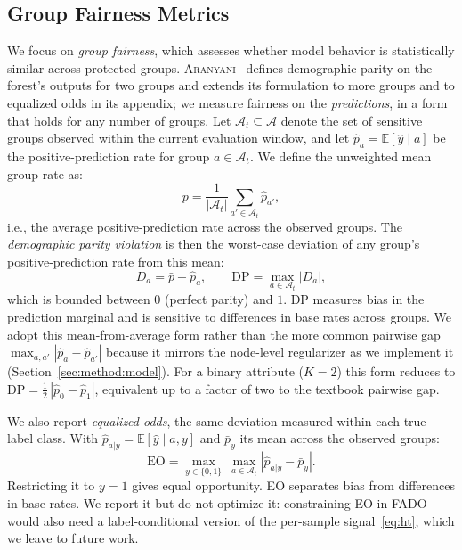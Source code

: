 \documentclass[conference]{IEEEtran}
\newcommand{\fado}{\textsc{FADO}}
\newcommand{\ara}{\textsc{Aranyani}}
\begin{document}
\subsection{Group Fairness Metrics}
\label{sec:problem:metrics}
We focus on \emph{group fairness}, which assesses whether model behavior is statistically similar across protected groups. \ara{}~\cite{chowdhury2024enhancing}
defines demographic parity on the forest's outputs for two groups and extends its formulation to more groups and to equalized odds in its appendix; we measure
fairness on the \emph{predictions}, in a form that holds for any number of groups. Let $\mathcal{A}_t \subseteq \mathcal{A}$ denote the set of sensitive groups observed
within the current evaluation window, and let $\hat{p}_a = \mathbb{E}[\hat{y} \mid a]$ be the positive-prediction rate for group $a \in \mathcal{A}_t$. We define the
unweighted mean group rate as:
\begin{equation}
\bar{p} = \frac{1}{|\mathcal{A}_t|}\sum_{a' \in \mathcal{A}_t}\hat{p}_{a'},
\end{equation}
i.e., the average positive-prediction rate across the observed groups. The \emph{demographic parity violation} is then the worst-case deviation of any group's
positive-prediction rate from this mean:
\begin{equation}
D_a = \bar{p}-\hat{p}_a, \qquad \mathrm{DP} = \max_{a \in \mathcal{A}_t}\left|D_a\right|,
\label{eq:dp}
\end{equation}
which is bounded between $0$ (perfect parity) and $1$. DP measures bias in the prediction marginal and is sensitive to differences in base rates across groups.
We adopt this mean-from-average form rather than the more common pairwise gap $\max_{a,a'}|\hat p_a - \hat p_{a'}|$ because it mirrors the node-level
regularizer as we implement it (Section~\ref{sec:method:model}). For a binary attribute ($K=2$) this form
reduces to $\mathrm{DP}=\tfrac{1}{2}\,|\hat p_0 - \hat p_1|$, equivalent up to a factor of two to the textbook pairwise gap.

We also report \emph{equalized odds}, the same deviation measured within each true-label class. With $\hat p_{a|y}=\mathbb{E}[\hat y\mid a,y]$ and
$\bar p_y$ its mean across the observed groups:
\begin{equation}
\mathrm{EO} = \max_{y \in \{0,1\}}\ \max_{a \in \mathcal{A}_t}\left|\hat{p}_{a|y} - \bar{p}_y\right|.
\end{equation}
Restricting it to $y{=}1$ gives equal opportunity. EO separates bias from differences in base rates. We report it but do not optimize it: constraining EO in 
\fado{} would also need a label-conditional version of the per-sample signal~\eqref{eq:ht}, which we leave to future work. 
\end{document}

